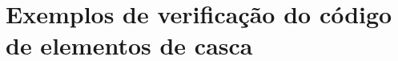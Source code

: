 \chapter[APÊNDICE \ref{Ap:CSD-Exemplos}]{Exemplos de verificação do código de elementos de casca}
\label{Ap:CSD-Exemplos}
